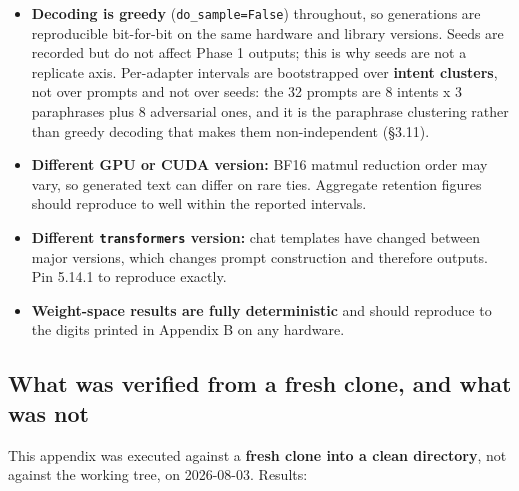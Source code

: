 \begin{itemize}\itemsep1pt
\item \textbf{Decoding is greedy} (\texttt{do\_\allowbreak{}sample=False}) throughout, so generations are reproducible bit-for-bit on the same hardware and library versions. Seeds are recorded but do not affect Phase 1 outputs; this is why seeds are not a replicate axis. Per-adapter intervals are bootstrapped over \textbf{intent clusters}, not over prompts and not over seeds: the 32 prompts are 8 intents x 3 paraphrases plus 8 adversarial ones, and it is the paraphrase clustering rather than greedy decoding that makes them non-independent (\S{}3.11).
\item \textbf{Different GPU or CUDA version:} BF16 matmul reduction order may vary, so generated text can differ on rare ties. Aggregate retention figures should reproduce to well within the reported intervals.
\item \textbf{Different \texttt{transformers} version:} chat templates have changed between major versions, which changes prompt construction and therefore outputs. Pin 5.14.1 to reproduce exactly.
\item \textbf{Weight-space results are fully deterministic} and should reproduce to the digits printed in Appendix B on any hardware.
\end{itemize}

\subsection{What was verified from a fresh clone, and what was not}

This appendix was executed against a \textbf{fresh clone into a clean directory}, not against the working tree, on 2026-08-03. Results:

